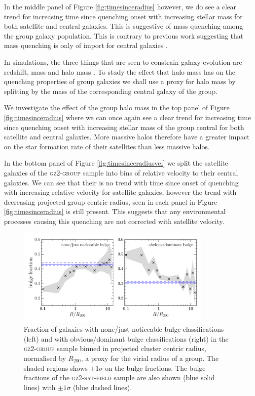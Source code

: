 \documentclass[useAMS,usenatbib]{mn2e}
\begin{document}
In the middle panel of Figure \ref{fig:timesinceradius} however, we do see a clear trend for increasing time since quenching onset with increasing stellar mass for both satellite and central galaxies. This is suggestive of mass quenching among the group galaxy population. This is contrary to previous work suggesting that mass quenching is only of import for central galaxies \citep{ref, ref, ref}. 

In simulations, the three things that are seen to constrain galaxy evolution are redshift, mass and halo mass \cite{ref, ref}. To study the effect that halo mass has on the quenching properties of group galaxies we shall use a proxy for halo mass by splitting by the mass of the corresponding central galaxy of the group.

We investigate the effect of the group halo mass in the top panel of Figure \ref{fig:timesinceradius} where we can once again see a clear trend for increasing time since quenching onset with increasing stellar mass of the group central for both satellite and central galaxies. More massive halos therefore have a greater impact on the star formation rate of their satellites than less massive halos. 

In the bottom panel of Figure \ref{fig:timesinceradiusvel} we split the satellite galaxies of the \textsc{gz2-group} sample into bins of relative velocity to their central galaxies. We can see that their is no trend with time since onset of quenching with increasing relative velocity for satellite galaxies, however the trend with decreasing projected group centric radius, seen in each panel in Figure \ref{fig:timesinceradius} is still present. This suggests that any environmental processes causing this quenching are not corrected with satellite velocity.  

\begin{figure}
\includegraphics[width=0.85\textwidth]{min_max_bulge_fraction_trend_with_log_radius_sat_field_cand.pdf}
\caption{Fraction of galaxies with none/just noticeable bulge classifications (left) and with obvious/dominant bulge classifications (right) in the \textsc{gz2-group} sample binned in projected cluster centric radius, normalised by $R_{200}$, a proxy for the virial radius of a group. The shaded regions shows $\pm1\sigma$ on the bulge fractions. The bulge fractions of the \textsc{gz2-sat-field} sample are also shown (blue solid lines) with $\pm1\sigma$ (blue dashed lines).}
\label{fig:bulgeradius}
\end{figure}
\end{document}
